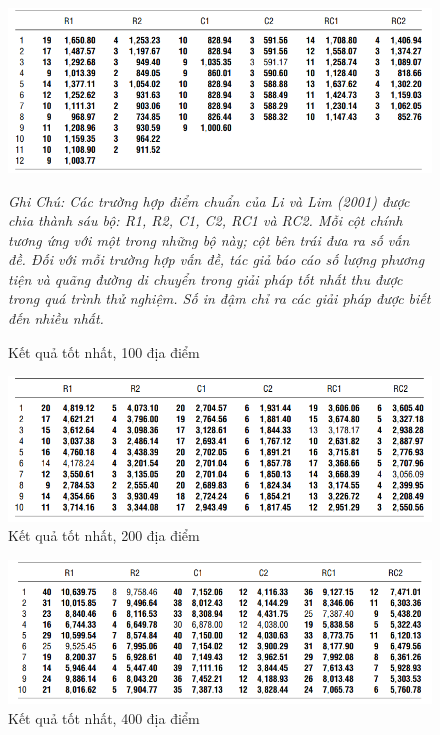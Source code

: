 \begin{center}
    \begin{figure}[htp]
    \caption{Kết quả tốt nhất, 100 địa điểm}        
    \begin{center}
     \includegraphics[scale=.5]{figures/Thuy_table11}
    \end{center}
  \textit{Ghi Chú: Các trường hợp điểm chuẩn của Li và Lim (2001) được chia thành sáu bộ: R1, R2, C1, C2, RC1 và RC2. Mỗi cột chính tương ứng với một trong những bộ này; cột bên trái đưa ra số vấn đề. Đối với mỗi trường hợp vấn đề, tác giả báo cáo số lượng phương tiện và quãng đường di chuyển trong giải pháp tốt nhất thu được trong quá trình thử nghiệm. Số in đậm chỉ ra các giải pháp được biết đến nhiều nhất.}
    \end{figure}
\end{center}


\begin{center}
    \begin{figure}[htp]
    \caption{Kết quả tốt nhất, 200 địa điểm}        
    \begin{center}
     \includegraphics[scale=.5]{figures/Thuy_table12}
    \end{center} 
    \end{figure}
\end{center}

\begin{center}
    \begin{figure}[htp]
    \caption{Kết quả tốt nhất, 400 địa điểm}        
    \begin{center}
     \includegraphics[scale=.5]{figures/Thuy_table13}
    \end{center}
    \end{figure}
\end{center}

